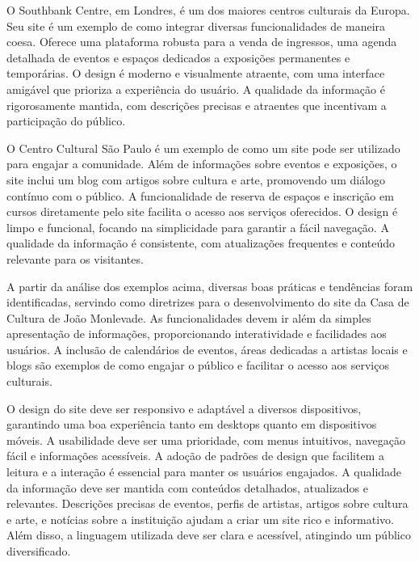 O Southbank Centre, em Londres, é um dos maiores centros culturais da Europa. Seu site é um exemplo de como integrar diversas funcionalidades de maneira coesa. Oferece uma plataforma robusta para a venda de ingressos, uma agenda detalhada de eventos e espaços dedicados a exposições permanentes e temporárias. O design é moderno e visualmente atraente, com uma interface amigável que prioriza a experiência do usuário. A qualidade da informação é rigorosamente mantida, com descrições precisas e atraentes que incentivam a participação do público.

O Centro Cultural São Paulo é um exemplo de como um site pode ser utilizado para engajar a comunidade. Além de informações sobre eventos e exposições, o site inclui um blog com artigos sobre cultura e arte, promovendo um diálogo contínuo com o público. A funcionalidade de reserva de espaços e inscrição em cursos diretamente pelo site facilita o acesso aos serviços oferecidos. O design é limpo e funcional, focando na simplicidade para garantir a fácil navegação. A qualidade da informação é consistente, com atualizações frequentes e conteúdo relevante para os visitantes.

A partir da análise dos exemplos acima, diversas boas práticas e tendências foram identificadas, servindo como diretrizes para o desenvolvimento do site da Casa de Cultura de João Monlevade. As funcionalidades devem ir além da simples apresentação de informações, proporcionando interatividade e facilidades aos usuários. A inclusão de calendários de eventos, áreas dedicadas a artistas locais e blogs são exemplos de como engajar o público e facilitar o acesso aos serviços culturais.

O design do site deve ser responsivo e adaptável a diversos dispositivos, garantindo uma boa experiência tanto em desktops quanto em dispositivos móveis. A usabilidade deve ser uma prioridade, com menus intuitivos, navegação fácil e informações acessíveis. A adoção de padrões de design que facilitem a leitura e a interação é essencial para manter os usuários engajados. A qualidade da informação deve ser mantida com conteúdos detalhados, atualizados e relevantes. Descrições precisas de eventos, perfis de artistas, artigos sobre cultura e arte, e notícias sobre a instituição ajudam a criar um site rico e informativo. Além disso, a linguagem utilizada deve ser clara e acessível, atingindo um público diversificado.

